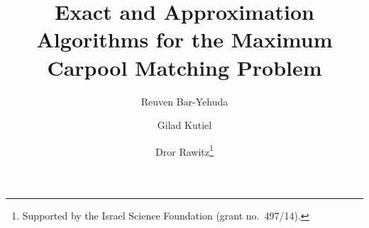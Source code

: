 \title{
Exact and Approximation Algorithms for the Maximum Carpool Matching Problem
}

% 
% 
% 

\author{
	Reuven Bar-Yehuda \and
	Gilad Kutiel \and
	Dror Rawitz\thanks{Supported by the Israel Science Foundation (grant no.~497/14).}
}




